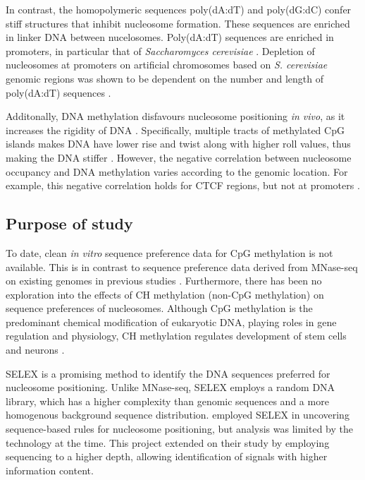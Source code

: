 \documentclass[parskip=full, numbers=noenddot]{scrbook}
\begin{document}
In contrast, the homopolymeric sequences poly(dA:dT) and poly(dG:dC) confer stiff structures that inhibit nucleosome formation.  These sequences are enriched in linker DNA between nucelosomes.  Poly(dA:dT) sequences are enriched in promoters, in particular that of \emph{Saccharomyces cerevisiae} \citep{struhl_determinants_2013}.  Depletion of nucleosomes at promoters on artificial chromosomes based on \emph{S. cerevisiae} genomic regions was shown to be dependent on the number and length of poly(dA:dT) sequences \citep{hughes_functional_2012}.

Additonally, DNA methylation disfavours nucleosome positioning \emph{in vivo}, as it increases the rigidity of DNA \citep{huff_dnmt1-independent_2014}.  Specifically, multiple tracts of methylated CpG islands makes DNA have lower rise and twist along with higher roll values, thus making the DNA stiffer \citep{rao_systematic_2018, perez_impact_2012}.  However, the negative correlation between nucleosome occupancy and DNA methylation varies according to the genomic location.  For example, this negative correlation holds for CTCF regions, but not at promoters \citep{kelly_genome-wide_2012}.

\subsection{Purpose of study}
\label{ssec:emsaselex_intro_why}

To date, clean \emph{in vitro} sequence preference data for CpG methylation is not available.  This is in contrast to sequence preference data derived from MNase-seq on existing genomes in previous studies \citep{struhl_determinants_2013, segal_genomic_2006, huff_dnmt1-independent_2014}.  Furthermore, there has been no exploration into the effects of CH methylation (non-CpG methylation) on sequence preferences of nucleosomes.  Although CpG methylation is the predominant chemical modification of eukaryotic DNA, playing roles in gene regulation and physiology, CH methylation regulates development of stem cells and neurons \citep{guo_distribution_2014}.

SELEX is a promising method to identify the DNA sequences preferred for nucleosome positioning.  Unlike MNase-seq, SELEX employs a random DNA library, which has a higher complexity than genomic sequences and a more homogenous background sequence distribution.  \citet{lowary_new_1998} employed SELEX in uncovering sequence-based rules for nucleosome positioning, but analysis was limited by the technology at the time.  This project extended on their study by employing sequencing to a higher depth, allowing identification of signals with higher information content.
\end{document}
